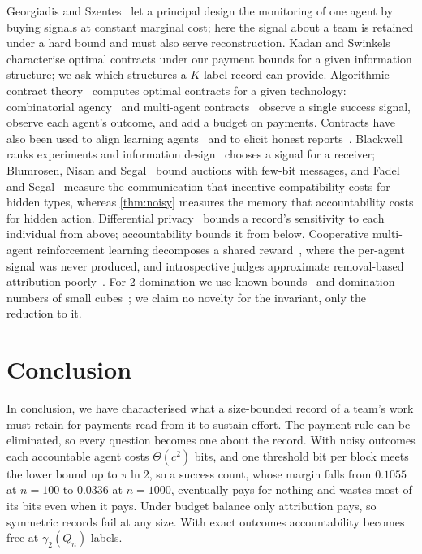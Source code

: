 \documentclass[sigconf,anonymous,acmthm=false]{acmart}
\theoremstyle{acmplain}
\theoremstyle{acmdefinition}
\begin{document}
Georgiadis and Szentes~\cite{georgiadisszentes2020} let a principal design the monitoring of
one agent by buying signals at constant marginal cost; here the signal about a team is
retained under a hard bound and must also serve reconstruction. Kadan and
Swinkels~\cite{kadanswinkels2008} characterise optimal contracts under our payment bounds for
a given information structure; we ask which structures a $K$-label record can provide.
Algorithmic contract theory~\cite{dutting2024survey} computes optimal contracts for a given
technology: combinatorial agency~\cite{babaioff2006combinatorial} and multi-agent
contracts~\cite{dutting2025multiagent,dutting2025combinatorial} observe a single success
signal, \cite{castiglioni2023multiagent} observe each agent's outcome, and
\cite{goel2024weighted} add a budget on payments. Contracts have also been used to align
learning agents~\cite{haupt2023contracts,ivanov2024principal} and to elicit honest
reports~\cite{shao2025truth}. Blackwell~\cite{blackwell1953comparisons} ranks experiments and
information design~\cite{kamenica2011persuasion} chooses a signal for a receiver; Blumrosen,
Nisan and Segal~\cite{blumrosen2007auctions} bound auctions with few-bit messages, and Fadel
and Segal~\cite{fadelsegal2009} measure the communication that incentive compatibility costs
for hidden types, whereas \cref{thm:noisy} measures the memory that accountability costs for
hidden action. Differential privacy~\cite{dwork2006calibrating} bounds a record's sensitivity
to each individual from above; accountability bounds it from below. Cooperative multi-agent
reinforcement learning decomposes a shared
reward~\cite{foerster2018coma,sunehag2018vdn,rashid2018qmix,li2025nucleolus}, where the
per-agent signal was never produced, and introspective judges approximate removal-based
attribution poorly~\cite{lu2026agents}. For 2-domination we use known
bounds~\cite{fink1985ndomination,chellali2012survey,bujtas2016bounds} and domination numbers
of small cubes~\cite{ostergard2001length9}; we claim no novelty for the invariant, only the
reduction to it.

\section{Conclusion}\label{sec:conclusion}

In conclusion, we have characterised what a size-bounded record of a team's work must retain
for payments read from it to sustain effort. The payment rule can be eliminated, so every
question becomes one about the record. With noisy outcomes each accountable agent costs
$\Theta(c^2)$ bits, and one threshold bit per block meets the lower bound up to $\pi\ln2$, so
a success count, whose margin falls from $0.1055$ at $n=100$ to $0.0336$ at $n=1000$,
eventually pays for nothing and wastes most of its bits even when it pays.
Under budget balance only attribution pays, so symmetric records fail at any size. With exact
outcomes accountability becomes free at $\gamma_2(Q_n)$ labels.
\end{document}
